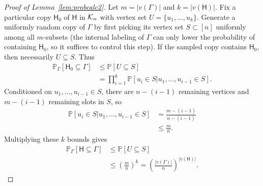 \documentclass[12pt]{article}
\def\P{{\mathbb P}}
\newcommand {\pr} {\mathbb{P}}
\newcommand{\calK}{{\cal K}}
\newcommand{\p}[1]{\left(#1\right)}
\newcommand{\s}[1]{\mathsf{#1}}
\begin{document}
\begin{proof}[Proof of Lemma~\ref{lem:probcalc2}]
Let $m = |v(\Gamma)|$ and $k = |v(\s{H})|$. Fix a particular copy $\s{H}_0$ of $\s{H}$ in $\calK_n$ with vertex set $U = \{u_1,\dots,u_k\}$. Generate a uniformly random copy of $\Gamma$ by first picking its vertex set $S \subset [n]$ uniformly among all $m$-subsets (the internal labeling of $\Gamma$ can only lower the probability of containing $\s{H}_0$, so it suffices to control this step). If the sampled copy contains $\s{H}_0$, then necessarily $U \subseteq S$. Thus
\begin{align}
\pr_{\Gamma}[\s{H}_0 \subseteq \Gamma]&\leq \pr[U \subseteq S]\\
&= \prod_{i=1}^{k} \pr[u_i \in S \vert u_1,\dots,u_{i-1} \in S].
\end{align}
Conditioned on $u_1,\dots,u_{i-1} \in S$, there are $n-(i-1)$ remaining vertices and $m-(i-1)$ remaining slots in $S$, so
\begin{align}
\pr[u_i \in S \vert u_1,\dots,u_{i-1} \in S] 
&= \frac{m-(i-1)}{n-(i-1)}\\
&\leq \frac{m}{n}. 
\end{align}
Multiplying these $k$ bounds gives
\begin{align}
\pr_{\Gamma}[\s{H} \subseteq \Gamma] &\leq\pr[U \subseteq S]\\
&\leq \left(\frac{m}{n}\right)^k = \left(\frac{|v(\Gamma)|}{n}\right)^{|v(\s{H})|}.
\end{align}
\end{proof}
\end{document}
